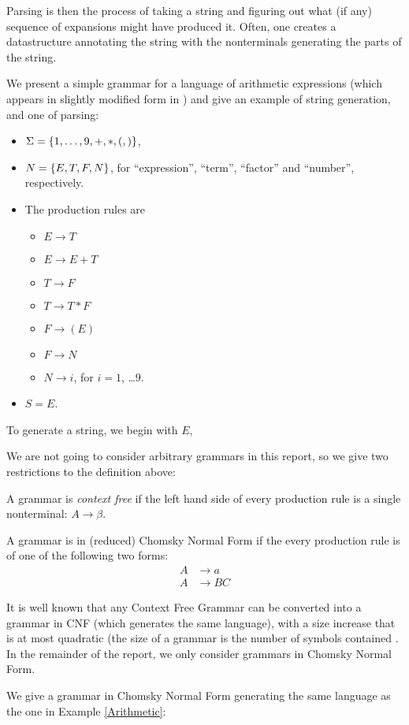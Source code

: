 Parsing is then the process of taking a string and figuring out what (if any) sequence of expansions might have produced it. Often, one creates a datastructure annotating the string with the nonterminals generating the parts of the string.
\begin{Example}
  \label{Arithmetic}
  We present a simple grammar for a language of arithmetic expressions (which appears in slightly modified form in \cite{Lange-Leiss}) and give an example of string generation, and one of parsing: 
  \begin{itemize}
  \item $\Sigma = \{1,\ldots , 9, +, *, (, )\}$,
  \item $N = \{E, T, F, N\}$, for ``expression'', ``term'', ``factor'' and ``number'', respectively.
  \item The production rules are
    \begin{itemize}
    \item $E \to T$
    \item $E \to E + T$
    \item $T \to F$
    \item $T \to T * F$ 
    \item $F \to ( E )$
    \item $F \to N$
    \item $N \to i$, for $i = 1$, \ldots $9$. 
    \end{itemize}
  \item $S = E$.
  \end{itemize}
  To generate a string, we begin with $E$, 
\end{Example}
We are not going to consider arbitrary grammars in this report, so we give two restrictions to the definition above: 
\begin{Definition}
  A grammar is \emph{context free} if the left hand side of every production rule is a single nonterminal: $A \to \beta$.
\end{Definition}
\begin{Definition}
  A grammar is in (reduced) Chomsky Normal Form \cite{Chomsky} if the every production rule is of one of the following two forms:
  \begin{align*}
  A &\to a\\
  A &\to BC 
  \end{align*}
\end{Definition}
It is well known that any Context Free Grammar can be converted into a grammar in CNF (which generates the same language), with a size increase that is at most quadratic (the size of a grammar is the number of symbols contained \cite{Lange-Leiss}.
In the remainder of the report, we only consider grammars in Chomsky Normal Form.
\begin{Example}
  \label{CNF-Ex}
  We give a grammar in Chomsky Normal Form generating the same language as the one in Example \ref{Arithmetic}:
\end{Example}

